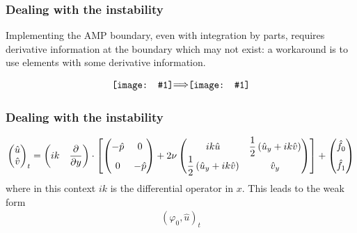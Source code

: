 \documentclass[8pt]{beamer}
\newcommand*{\vcenterimage}[1]{\vcenter{\hbox{\texttt{[image: \#1]}}}}
\newcommand*{\vcenterarrow}{\vcenter{\hbox{$\Longrightarrow$}}}
\begin{document}
\begin{frame}
    \frametitle{Dealing with the instability}
    Implementing the AMP boundary, even with integration by parts, requires
    derivative information at the boundary which may not exist: a workaround is
    to use elements with some derivative information.

    \begin{figure}
        \begin{equation*}
            \vcenterimage{lagrange-quadratics.png}
            \vcenterarrow
            \vcenterimage{hermite-quadratics.png}
        \end{equation*}
    \end{figure}
\end{frame}

\begin{frame}
    \frametitle{Dealing with the instability}
    \begin{align}
        \begin{pmatrix}
            \hat{u} \\ \hat{v}
        \end{pmatrix}_t
        =
        \begin{pmatrix}
            i k & \dfrac{\partial}{\partial y}
        \end{pmatrix}
        \cdot
        \left[
        \begin{pmatrix}
            -\hat{p} \vphantom{\dfrac{1}{2}} & 0                              \\
            0 \vphantom{\dfrac{1}{2}}        & -\hat{p}
        \end{pmatrix}
        +
        2 \nu
        \begin{pmatrix}
            i k \hat{u} & \dfrac{1}{2} \left(\hat{u}_y + i k \hat{v}\right)   \\
            \dfrac{1}{2} \left(\hat{u}_y + i k \hat{v}\right) & \hat{v}_y
        \end{pmatrix}
        \right]
        +
        \begin{pmatrix}
            \hat{f}_0 \vphantom{\dfrac{1}{2}}                                 \\
            \hat{f}_1 \vphantom{\dfrac{1}{2}}
        \end{pmatrix}
    \end{align}
    where in this context \(i k\) is the differential operator in \(x\). This
    leads to the weak form
    \begin{align}
        (\varphi_0, \hat{u})_t

\end{align}
\end{frame}
\end{document}
